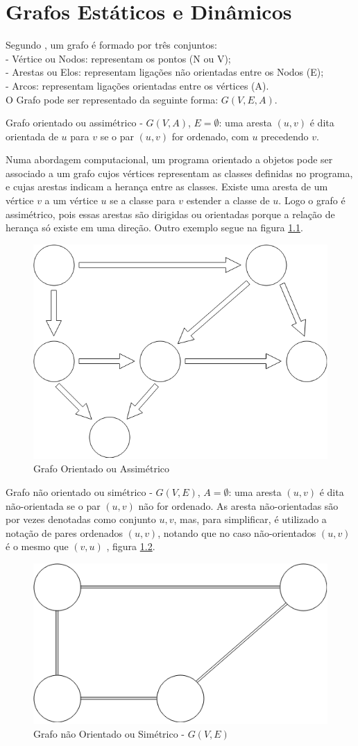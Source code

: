 \chapter{Grafos Estáticos e Dinâmicos} \label{grafoestdin}
Segundo \cite{negreirosbook}, um grafo é formado por três conjuntos:\\
- Vértice ou Nodos: representam os pontos (N ou V);\\
- Arestas ou Elos: representam ligações não orientadas entre os Nodos (E);\\
- Arcos: representam ligações orientadas entre os vértices (A).\\
O Grafo pode ser representado da seguinte forma: $G(V, E, A)$.

Grafo orientado ou assimétrico - $G(V, A)$, $E = \emptyset$: uma aresta $(u,v)$ é dita orientada de $u$
para $v$ se o par $(u,v)$ for ordenado, com $u$ precedendo $v$.

Numa abordagem computacional, um programa orientado a objetos pode ser associado a um grafo cujos vértices
representam as classes definidas no programa, e cujas arestas indicam a herança entre as classes.
Existe uma aresta de um vértice $v$ a um vértice $u$ se a classe para $v$ estender a classe de $u$.
Logo o grafo é assimétrico, pois essas arestas são dirigidas ou orientadas porque a relação de herança
só existe em uma direção. Outro exemplo segue na figura \ref{fig:assimetrico}.

\begin{figure}[htbp]
\centering
 \includegraphics[width=.35\textwidth]{chapters/fig/assimetrico1.png}
\caption{Grafo Orientado ou Assimétrico}
\label{fig:assimetrico}
\end{figure}

Grafo não orientado ou simétrico - $G(V, E)$, $A = \emptyset$: uma aresta $(u,v)$ é dita não-orientada
se o par $(u,v)$ não for ordenado. As aresta não-orientadas são por vezes denotadas como conjunto ${u,v}$,
mas, para simplificar, é utilizado a notação de pares ordenados $(u,v)$, notando que no caso não-orientados
$(u,v)$ é o mesmo que $(v,u)$ \cite{goodrich}, figura \ref{fig:simetrico}.

\begin{figure}[htbp]
\centering
 \includegraphics[width=.35\textwidth]{chapters/fig/simetrico1.png}
\caption{Grafo não Orientado ou Simétrico - $G(V,E)$}
\label{fig:simetrico}
\end{figure}
\FloatBarrier

